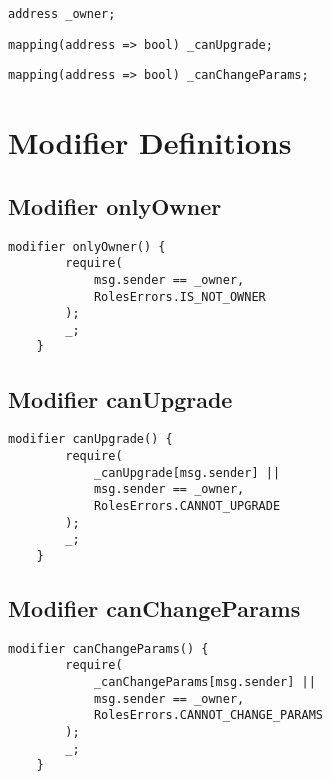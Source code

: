 \begin{lstlisting}[firstnumber=13]
    address _owner;
\end{lstlisting}

\begin{lstlisting}[firstnumber=14]
    mapping(address => bool) _canUpgrade;
\end{lstlisting}

\begin{lstlisting}[firstnumber=15]
    mapping(address => bool) _canChangeParams;
\end{lstlisting}

\section{Modifier Definitions}


\subsection{Modifier onlyOwner}


\begin{lstlisting}[firstnumber=62]
    modifier onlyOwner() {
        require(
            msg.sender == _owner,
            RolesErrors.IS_NOT_OWNER
        );
        _;
    }
\end{lstlisting}

\subsection{Modifier canUpgrade}


\begin{lstlisting}[firstnumber=70]
    modifier canUpgrade() {
        require(
            _canUpgrade[msg.sender] ||
            msg.sender == _owner,
            RolesErrors.CANNOT_UPGRADE
        );
        _;
    }
\end{lstlisting}

\subsection{Modifier canChangeParams}


\begin{lstlisting}[firstnumber=79]
    modifier canChangeParams() {
        require(
            _canChangeParams[msg.sender] ||
            msg.sender == _owner,
            RolesErrors.CANNOT_CHANGE_PARAMS
        );
        _;
    }
\end{lstlisting}

